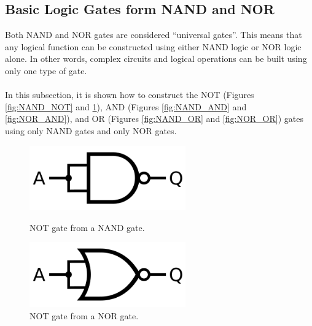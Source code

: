 
\subsection{Basic Logic Gates form NAND and NOR}
    Both NAND and NOR gates are considered \enquote{universal gates}. 
    This means that any logical function can be constructed using either NAND logic or NOR logic alone. 
    In other words, complex circuits and logical operations can be built using only one type of gate. \\\\
    In this subsection, it is shown how to construct the NOT (Figures \ref{fig:NAND_NOT} and \ref{fig:NOR_NOT}), AND (Figures \ref{fig:NAND_AND} and \ref{fig:NOR_AND}), and OR (Figures \ref{fig:NAND_OR} and \ref{fig:NOR_OR}) gates using only NAND gates and only NOR gates. \\

    \begin{figure}[H]   
        \begin{minipage}{0.5\textwidth}
            \centering
    	    \includegraphics[width=0.6\textwidth]{figures/NOT_from_NAND.png}
	        \caption{NOT gate from a NAND gate.}
	        \label{fig:NAND_NOT} 
	    \end{minipage}	
        \begin{minipage}{0.5\textwidth}
            \centering
    	    \includegraphics[width=0.6\textwidth]{figures/NOT_from_NOR.png}
            \caption{NOT gate from a NOR gate.}
            \label{fig:NOR_NOT}
        \end{minipage}
    \end{figure}

